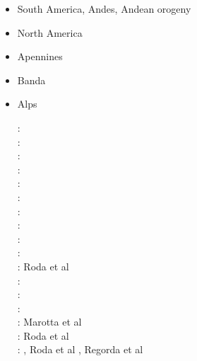 \begin{itemize}
\item South America, Andes, Andean orogeny 
{\scriptsize
\cite{wdbo94b}
\cite{gusb00}
\cite{vavv02b}
\cite{baso05}\cite{soba05}
\cite{basv06}\cite{meph06}\cite{iabd06}\cite{oncf06}\cite{sobk06}
\cite{iabb07}
\cite{esfm08}\cite{heib08}\cite{iabu08}
\cite{kecw09}\cite{gecm09}
\cite{hucf12}\cite{shlm12}\cite{iadc12}
\cite{waja13}
\cite{cudd15}\cite{ealw15}
\cite{robn16}\cite{marl16}\cite{chdf16}\cite{hulh16}
\cite{sche17}
\cite{yamg19}
}
\item North America 
{\scriptsize
\cite{sabu73}
\cite{huha90}
\cite{bugm97}
\cite{besb06}
\cite{splg08}
\cite{splg09}
\cite{beck12}
\cite{ghbh13}\cite{simi13}
\cite{riag15}
}
\item Apennines 
{\scriptsize
\cite{buwg98}
\cite{shpy07}
\cite{rohu09}
\cite{vami15}
}

\item Banda 
{\scriptsize
\cite{rohu09}
\cite{spha10}
}

\item Alps 

\begin{scriptsize}
\nineteenninetysix: \cite{beeh96}\\
\nineteenninetyseven: \cite{repe97}\\
\nineteenninetyeight: \cite{desw98}\\
\twothousand: \cite{pfeb00}\\
\twothousandone: \cite{bujl01}\\
\twothousandtwo: \cite{pfsb02}\\
\twothousandthree: \cite{pimo03}\\
\twothousandfive: \cite{buge05}\\
\twothousandseven: \cite{masp07}\\
\twothousandeight: \cite{vifj08}\\
\twothousandtwelve: Roda et al \cite{rosm12}\\
\twothousandthirteen: \cite{luws13}\cite{baes13}\cite{bubj13}\\
\twothousandfourteen: \cite{bubj14}\\
\twothousandfifteen: \cite{scdu15}\cite{fohk15}\\
\twothousandeighteen: Marotta et al \cite{marc18}\\
\twothousandnineteen: Roda et al \cite{rors19}\\
\twothousandtwenty: \cite{kids20}, Roda et al \cite{rozr20}, Regorda et al \cite{relr20}
\end{scriptsize}


\end{itemize}
